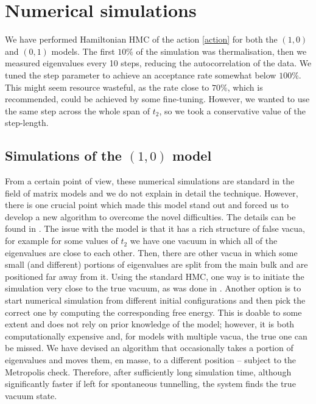 \documentclass[10pt]{article}
\theoremstyle{plain}
\theoremstyle{definition}
\theoremstyle{plain}
\begin{document}
\section{Numerical simulations}\label{sec:MC}

We have performed Hamiltonian HMC \cite{brooks2011handbook, Duane:1987de} of the action \eqref{action} for both the $(1,0)$ and $(0,1)$ models. The first $10\%$ of the simulation was thermalisation, then we measured eigenvalues every 10 steps, reducing the autocorrelation of the data. We tuned the step parameter to achieve an acceptance rate somewhat below $100\%$. This might seem resource wasteful, as the rate close to $70\%$, which is recommended, could be achieved by some fine-tuning. However, we wanted to use the same step across the whole span of $t_2$, so we took a conservative value of the step-length. 

\subsection{Simulations of the $(1,0)$ model}

From a certain point of view, these numerical simulations are standard in the field of matrix models and we do not explain in detail the technique. However, there is one crucial point which made this model stand out and forced us to develop a new algorithm to overcome the novel difficulties. The details can be found in \cite{Kovacik:2026ybz}. The issue with the model is that it has a rich structure of false vacua, for example for some values of $t_2$ we have one vacuum in which all of the eigenvalues are close to each other. Then, there are other vacua in which some small (and different) portions of eigenvalues are split from the main bulk and are positioned far away from it. Using the standard HMC, one way is to initiate the simulation very close to the true vacuum, as was done in \cite{d2026symmetry}. Another option is to start numerical simulation from different initial configurations and then pick the correct one by computing the corresponding free energy. This is doable to some extent and does not rely on prior knowledge of the model; however, it is both computationally expensive and, for models with multiple vacua, the true one can be missed. We have devised an algorithm that occasionally takes a portion of eigenvalues and moves them, en masse, to a different position – subject to the Metropolis check. Therefore, after sufficiently long simulation time, although significantly faster if left for spontaneous tunnelling, the system finds the true vacuum state. 
\end{document}
